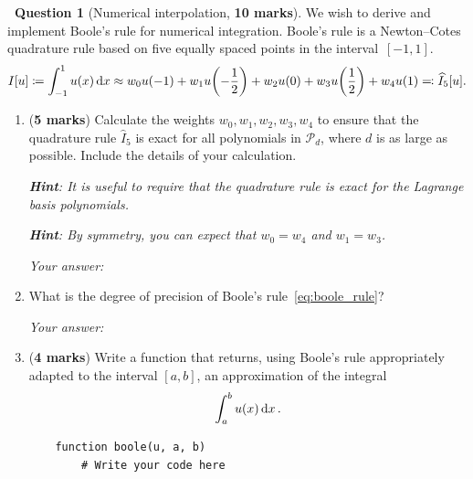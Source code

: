 \documentclass[10pt]{article}
\theoremstyle{definition}
\newtheorem{question}{{\normalfont \faGears}~Question}
\renewcommand{\mymarks}[1]{\textbf{#1 marks}}
\begin{document}
\newpage
\begin{question}
    [Numerical interpolation, \mymarks{10}]
    We wish to derive and implement Boole's rule for numerical integration.
    Boole's rule is a Newton--Cotes quadrature rule based on five equally spaced points in the interval~$[-1, 1]$.
    \begin{equation}
        \label{eq:boole_rule}
        I[u] \coloneq \int_{-1}^{1} u(x) \, \mathrm d x
        \approx w_0 u(-1) + w_1 u{\left(- \frac{1}{2}\right)} + w_2 u(0) + w_3 u{\left(\frac{1}{2}\right)} + w_4 u(1)
        \eqcolon \widehat I_5[u].
    \end{equation}

    \begin{enumerate}
        \item
            (\mymarks{5})
            Calculate the weights $w_0, w_1, w_2, w_3, w_4$ to ensure that the quadrature rule $\widehat I_5$ is exact for all polynomials in $\mathcal P_d$,
            where $d$ is as large as possible.
            Include the details of your calculation.

            \textit{\textbf{Hint}: It is useful to require that the quadrature rule is exact for the Lagrange basis polynomials.}

            \textit{\textbf{Hint}: By symmetry, you can expect that $w_0 = w_4$ and $w_1 = w_3$.}

            \textit{Your answer:}
            \vspace{13cm}

        \item
            \mymark
            What is the degree of precision of Boole's rule~\eqref{eq:boole_rule}?

            \textit{Your answer:}

        \newpage
        \item
            (\mymarks{4})
            Write a function  that returns, using Boole's rule appropriately adapted to the interval $[a, b]$,
            an approximation of the integral
            \begin{align}
                \label{eq:integral_midpoint}
                \int_{a}^{b} u(x) \, \mathrm d x \, .
            \end{align}

            \begin{verbatim}
    function boole(u, a, b)
        # Write your code here















\end{verbatim}
\end{enumerate}
\end{question}
\end{document}
